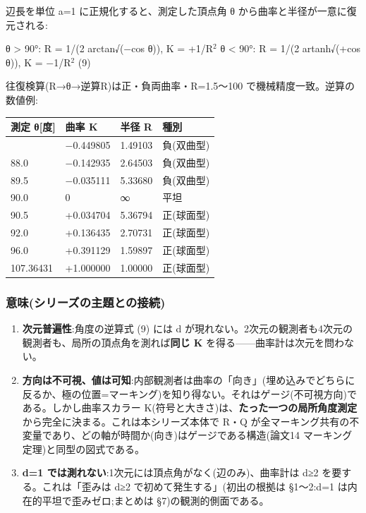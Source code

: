 \documentclass[
]{ltjsarticle}
\newcounter{none} %
\begin{document}
辺長を単位 a=1 に正規化すると、測定した頂点角 θ
から曲率と半径が一意に復元される:

θ \textgreater{} 90°: R = 1/(2 arctan√(−cos θ)), K = +1/R\(^{2}\) θ
\textless{} 90°: R = 1/(2 artanh√(+cos θ)), K = −1/R\(^{2}\) (9)

往復検算(R→θ→逆算R)は正・負両曲率・R=1.5〜100
で機械精度一致。逆算の数値例:

{\def\LTcaptype{none} %
\begin{longtable}[]{@{}llll@{}}
\toprule\noalign{}
測定 θ{[}度{]} & 曲率 K & 半径 R & 種別 \\
\midrule\noalign{}
\endhead
\bottomrule\noalign{}
\endlastfoot
84.0 & −0.449805 & 1.49103 & 負(双曲型) \\
88.0 & −0.142935 & 2.64503 & 負(双曲型) \\
89.5 & −0.035111 & 5.33680 & 負(双曲型) \\
90.0 & 0 & ∞ & 平坦 \\
90.5 & +0.034704 & 5.36794 & 正(球面型) \\
92.0 & +0.136435 & 2.70731 & 正(球面型) \\
96.0 & +0.391129 & 1.59897 & 正(球面型) \\
107.36431 & +1.000000 & 1.00000 & 正(球面型) \\
\end{longtable}
}

\subsubsection{意味(シリーズの主題との接続)}\label{ux610fux5473ux30b7ux30eaux30fcux30baux306eux4e3bux984cux3068ux306eux63a5ux7d9a}

\begin{enumerate}
\def\labelenumi{(\roman{enumi})}
\item
  \textbf{次元普遍性}:角度の逆算式 (9) には d
  が現れない。2次元の観測者も4次元の観測者も、局所の頂点角を測れば\textbf{同じ
  K} を得る------曲率計は次元を問わない。
\item
  \textbf{方向は不可視、値は可知}:内部観測者は曲率の「向き」(埋め込みでどちらに反るか、極の位置=マーキング)を知り得ない。それはゲージ(不可視方向)である。しかし曲率スカラー
  K(符号と大きさ)は、\textbf{たった一つの局所角度測定}から完全に決まる。これは本シリーズ本体で
  R・Q
  が全マーキング共有の不変量であり、どの軸が時間か(向き)はゲージである構造(論文14
  マーキング定理)と同型の図式である。
\item
  \textbf{d=1 では測れない}:1次元には頂点角がなく(辺のみ)、曲率計は d≥2
  を要する。これは「歪みは d≥2 で初めて発生する」(初出の根拠は §1〜2:d=1
  は内在的平坦で歪みゼロ;まとめは §7)の観測的側面である。
\end{enumerate}
\end{document}

